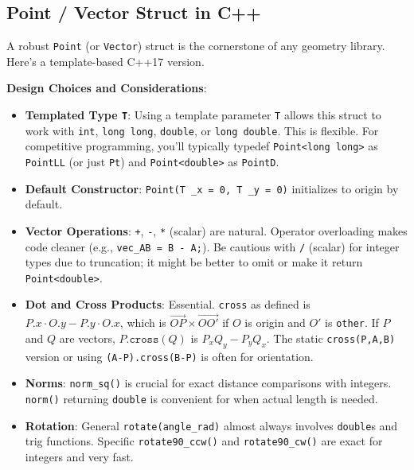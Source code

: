 \subsection{Point / Vector Struct in C++}
\label{ssec:A.5.1}

A robust \texttt{Point} (or \texttt{Vector}) struct is the cornerstone of any geometry library. Here's a template-based C++17 version.



\begin{implementation}
\label{impl:A.5.1.point_struct_choices}
\textbf{Design Choices and Considerations}:
\begin{itemize}
    \item \textbf{Templated Type \texttt{T}}: Using a template parameter \texttt{T} allows this struct to work with \texttt{int}, \texttt{long long}, \texttt{double}, or \texttt{long double}. This is flexible. For competitive programming, you'll typically typedef \texttt{Point<long long>} as \texttt{PointLL} (or just \texttt{Pt}) and \texttt{Point<double>} as \texttt{PointD}.
    \item \textbf{Default Constructor}: \texttt{Point(T \_x = 0, T \_y = 0)} initializes to origin by default.
    \item \textbf{Vector Operations}: \texttt{+}, \texttt{-}, \texttt{*} (scalar) are natural. Operator overloading makes code cleaner (e.g., \texttt{vec\_AB = B - A;}). Be cautious with \texttt{/} (scalar) for integer types due to truncation; it might be better to omit or make it return \texttt{Point<double>}.
    \item \textbf{Dot and Cross Products}: Essential. \texttt{cross} as defined is $P.x \cdot O.y - P.y \cdot O.x$, which is $\vec{OP} \times \vec{OO'}$ if $O$ is origin and $O'$ is \texttt{other}. If $P$ and $Q$ are vectors, $P.\texttt{cross}(Q)$ is $P_x Q_y - P_y Q_x$. The static \texttt{cross(P,A,B)} version or using \texttt{(A-P).cross(B-P)} is often for orientation.
    \item \textbf{Norms}: \texttt{norm\_sq()} is crucial for exact distance comparisons with integers. \texttt{norm()} returning \texttt{double} is convenient for when actual length is needed.
    \item \textbf{Rotation}: General \texttt{rotate(angle\_rad)} almost always involves \texttt{double}s and trig functions. Specific \texttt{rotate90\_ccw()} and \texttt{rotate90\_cw()} are exact for integers and very fast.

\end{itemize}
\end{implementation}
